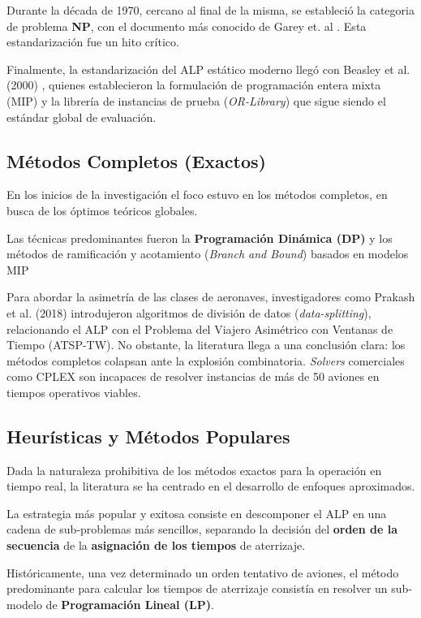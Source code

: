 \documentclass[letter, 10pt]{article}
\begin{document}
Durante la d\'ecada de 1970, cercano al final de la misma, se estableci\'o la categoria de problema \textbf{NP}, con el documento m\'as conocido de Garey et. al \cite{garey1979}. Esta estandarizaci\'on fue un hito cr\'itico.

Finalmente, la estandarizaci\'on del ALP est\'atico moderno lleg\'o con Beasley et al. (2000) \cite{beasley2000}, quienes establecieron la formulaci\'on de programaci\'on entera mixta (MIP) y la librer\'ia de instancias de prueba (\textit{OR-Library}) que sigue siendo el est\'andar global de evaluaci\'on.


\subsection{M\'etodos Completos (Exactos)}
En los inicios de la investigaci\'on el foco estuvo en los m\'etodos completos, en busca de los \'optimos te\'oricos globales.

Las t\'ecnicas predominantes fueron la \textbf{Programaci\'on Din\'amica (DP)} y los m\'etodos de ramificaci\'on y acotamiento (\textit{Branch and Bound}) basados en modelos MIP \cite{beasley2000}

Para abordar la asimetr\'ia de las clases de aeronaves, investigadores como Prakash et al. (2018) \cite{prakash2018} introdujeron algoritmos de divisi\'on de datos (\textit{data-splitting}), relacionando el ALP con el Problema del Viajero Asim\'etrico con Ventanas de Tiempo (ATSP-TW). No obstante, la literatura llega a una conclusi\'on clara: los m\'etodos completos colapsan ante la explosi\'on combinatoria. \textit{Solvers} comerciales como CPLEX son incapaces de resolver instancias de m\'as de 50 aviones en tiempos operativos viables.

\subsection{Heur\'isticas y M\'etodos Populares}
Dada la naturaleza prohibitiva de los m\'etodos exactos para la operaci\'on en tiempo real, la literatura se ha centrado en el desarrollo de enfoques aproximados. 

La estrategia m\'as popular y exitosa consiste en descomponer el ALP en una cadena de sub-problemas m\'as sencillos, separando la decisi\'on del \textbf{orden de la secuencia} de la \textbf{asignaci\'on de los tiempos} de aterrizaje\cite{ikli2021}.

Hist\'oricamente, una vez determinado un orden tentativo de aviones, el m\'etodo predominante para calcular los tiempos de aterrizaje consist\'ia en resolver un sub-modelo de \textbf{Programaci\'on Lineal (LP)}. 
\end{document}
